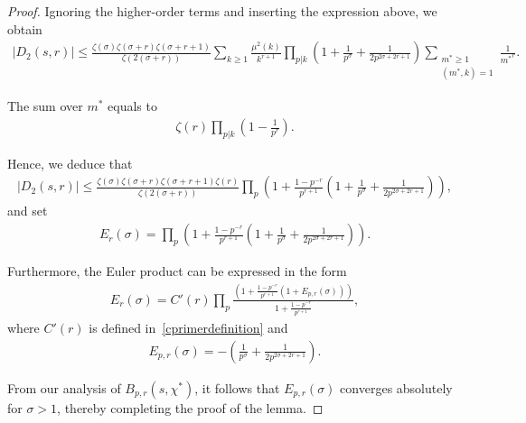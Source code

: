 \documentclass[12pt, oneside,reqno]{amsart}
\numberwithin{equation}{section}
\begin{document}
\begin{proof}
\noindent
Ignoring the higher-order terms and inserting the expression above, we obtain
\begin{align*}
|D_2(s,r)|
\leq\frac{\zeta(\sigma)\zeta(\sigma+r)\zeta(\sigma+r+1)}{\zeta(2(\sigma+r))}\sum_{k\geq 1}\frac{\mu^2(k)}{k^{r+1}}\prod_{p|k}\left(1+\frac{1}{p^{\sigma}}+\frac{1}{2p^{2\sigma+2r+1}}\right)\sum_{\substack{m^*\geq 1\\(m^*,k)=1}}\frac{1}{{m^*}^r}.
\end{align*}

\noindent
The sum over $m^*$ equals to
\begin{align*}
\zeta(r)\prod_{p|k}\left(1-\frac{1}{p^{r}}\right).  
\end{align*}

\noindent
Hence, we deduce that
\begin{align*}
|D_2(s,r)|
\leq\frac{\zeta(\sigma)\zeta(\sigma+r)\zeta(\sigma+r+1)\zeta(r)}{\zeta(2(\sigma+r))}\prod_{p}\left(1+\frac{1-p^{-r}}{p^{r+1}}\left(1+\frac{1}{p^{\sigma}}+\frac{1}{2p^{2\sigma+2r+1}}\right)\right),
\end{align*}
and set
\begin{align*}
E_r(\sigma)
=\prod_{p}\left(1+\frac{1-p^{-r}}{p^{r+1}}\left(1+\frac{1}{p^{\sigma}}+\frac{1}{2p^{2\sigma+2r+1}}\right)\right).
\end{align*}

\noindent
Furthermore, the Euler product can be expressed in the form
\begin{align*}
E_r(\sigma)
=C'(r)\prod_{p}\frac{\left(1+\frac{1-p^{-r}}{p^{r+1}}(1+E_{p,r}(\sigma))\right)}{1+\frac{1-p^{-r}}{p^{r+1}}},
\end{align*}
where $C'(r)$ is defined in~\eqref{cprimerdefinition} and
\begin{align*}
E_{p,r}(\sigma)
=-\left(\frac{1}{p^{\sigma}}+\frac{1}{2p^{2\sigma+2r+1}}\right).
\end{align*}

\noindent
From our analysis of $B_{p,r}(s,\chi^*)$, it follows that $E_{p,r}(\sigma)$ converges absolutely for $\sigma>1$, thereby completing the proof of the lemma.
\end{proof}


\end{document}
